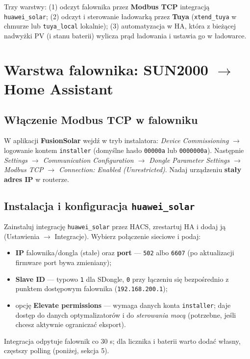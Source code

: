 \documentclass[11pt]{article}
\newcommand{\key}[1]{\textbf{\color{navy}#1}}
\begin{document}
Trzy warstwy: (1) odczyt falownika przez \key{Modbus TCP} integracją \texttt{huawei\_solar}; (2) odczyt i sterowanie ładowarką przez \key{Tuya} (\texttt{xtend\_tuya} w chmurze lub \texttt{tuya\_local} lokalnie); (3) automatyzacja w HA, która z bieżącej nadwyżki PV (i stanu baterii) wylicza prąd ładowania i ustawia go w ładowarce.

\section{Warstwa falownika: SUN2000 \texorpdfstring{$\rightarrow$}{->} Home Assistant}
\subsection{Włączenie Modbus TCP w falowniku}
W aplikacji \key{FusionSolar} wejdź w tryb instalatora: \emph{Device Commissioning} $\rightarrow$ logowanie kontem \texttt{installer} (domyślne hasło \texttt{00000a} lub \texttt{0000000a}). Następnie \emph{Settings $\rightarrow$ Communication Configuration $\rightarrow$ Dongle Parameter Settings $\rightarrow$ Modbus TCP $\rightarrow$ Connection: Enabled (Unrestricted)}. Nadaj urządzeniu \key{stały adres IP} w routerze.

\subsection{Instalacja i konfiguracja \texttt{huawei\_solar}}
Zainstaluj integrację \texttt{huawei\_solar} przez HACS, zrestartuj HA i dodaj ją (Ustawienia $\rightarrow$ Integracje). Wybierz połączenie sieciowe i podaj:
\begin{itemize}
\item \key{IP} falownika/dongla (stałe) oraz \key{port} — \texttt{502} albo \texttt{6607} (po aktualizacji firmware port bywa zmieniany);
\item \key{Slave ID} — typowo \texttt{1} dla SDongle, \texttt{0} przy łączeniu się bezpośrednio z punktem dostępowym falownika (\texttt{192.168.200.1});
\item opcję \key{Elevate permissions} — wymaga danych konta \texttt{installer}; daje dostęp do danych optymalizatorów i do \emph{sterowania mocą} (potrzebne, jeśli chcesz aktywnie ograniczać eksport).
\end{itemize}
Integracja odpytuje falownik co 30 s; dla licznika i baterii warto dodać własny, częstszy polling (poniżej, sekcja 5).
\end{document}
